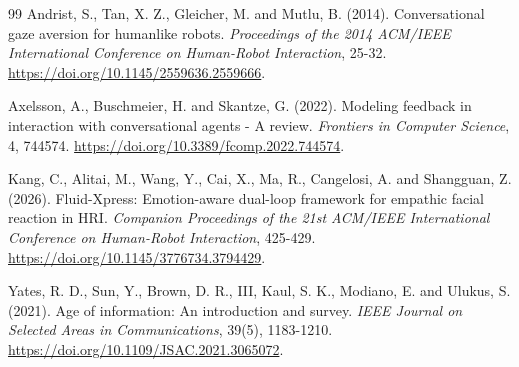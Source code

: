 \documentclass[11pt,a4paper]{article}
\begin{document}
\begin{thebibliography}{99}
 Andrist, S., Tan, X. Z., Gleicher, M. and Mutlu, B. (2014). Conversational gaze aversion for humanlike robots. \emph{Proceedings of the 2014 ACM/IEEE International Conference on Human-Robot Interaction}, 25-32. \url{https://doi.org/10.1145/2559636.2559666}.

 Axelsson, A., Buschmeier, H. and Skantze, G. (2022). Modeling feedback in interaction with conversational agents - A review. \emph{Frontiers in Computer Science}, 4, 744574. \url{https://doi.org/10.3389/fcomp.2022.744574}.

 Kang, C., Alitai, M., Wang, Y., Cai, X., Ma, R., Cangelosi, A. and Shangguan, Z. (2026). Fluid-Xpress: Emotion-aware dual-loop framework for empathic facial reaction in HRI. \emph{Companion Proceedings of the 21st ACM/IEEE International Conference on Human-Robot Interaction}, 425-429. \url{https://doi.org/10.1145/3776734.3794429}.

 Yates, R. D., Sun, Y., Brown, D. R., III, Kaul, S. K., Modiano, E. and Ulukus, S. (2021). Age of information: An introduction and survey. \emph{IEEE Journal on Selected Areas in Communications}, 39(5), 1183-1210. \url{https://doi.org/10.1109/JSAC.2021.3065072}.
\end{thebibliography}
\end{document}
